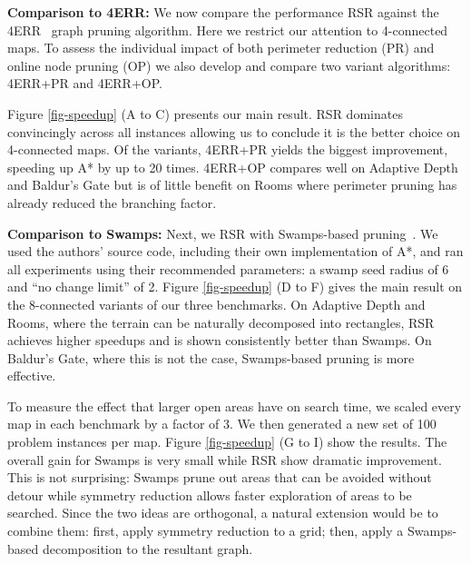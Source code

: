 \textbf{Comparison to 4ERR: }
We now compare the performance RSR against the 4ERR~\cite{harabor10} graph
pruning algorithm. Here we restrict our attention to 4-connected maps.  To
assess the individual impact of both perimeter reduction (PR) and online node
pruning (OP) we also develop and compare two variant algorithms: 4ERR+PR and
4ERR+OP. 
\par
Figure \ref{fig-speedup} (A to C) presents our main result. RSR dominates
convincingly across all instances allowing us to conclude it is the better
choice on 4-connected maps. 
Of the variants, 4ERR+PR yields the biggest improvement, speeding up A* by up to 20 times.
4ERR+OP compares well on Adaptive Depth and Baldur's Gate but is of little benefit on 
Rooms where perimeter pruning has already reduced the branching factor.
\par
\textbf{Comparison to Swamps:}
Next, we RSR with Swamps-based pruning~\cite{pochter10}.  
We used the authors' source code, including their own implementation of A*, and 
ran all experiments using their recommended parameters: a swamp seed radius of 6 
and ``no change limit'' of 2. Figure \ref{fig-speedup} (D to F) gives the main
result on the 8-connected variants of our three benchmarks.
On Adaptive Depth and Rooms, where the terrain can be naturally decomposed into
rectangles, RSR achieves higher speedups and is shown consistently better than Swamps. 
On Baldur's Gate, where this is not the case, Swamps-based pruning is more
effective. 
\par
To measure the effect that larger open areas have on search time, we scaled
every map in each benchmark by a factor of 3. We then generated a new set of 100
problem instances per map. Figure \ref{fig-speedup} (G
to I) show the results.  
The overall gain for Swamps is very small while RSR show dramatic improvement.
This is not surprising: Swamps prune out
areas that can be avoided without detour while symmetry reduction allows
faster exploration of areas to be searched.
Since the two ideas are orthogonal, a natural extension would be to combine them: 
first, apply symmetry reduction to a grid; then, apply a Swamps-based 
decomposition to the resultant graph.



